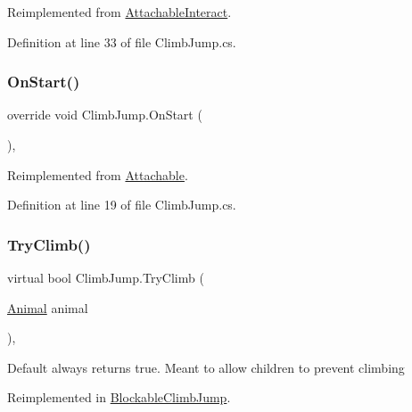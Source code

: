 Reimplemented from \mbox{\hyperlink{class_attachable_interact_a376127af23be5456604ee5ec39f02b9b}{Attachable\+Interact}}.



Definition at line 33 of file Climb\+Jump.\+cs.

\mbox{\label{class_climb_jump_a094788a5de43e24f111eec10ba0a3c88}} 
\subsubsection{\texorpdfstring{On\+Start()}{OnStart()}}
{\footnotesize\ttfamily override void Climb\+Jump.\+On\+Start (\begin{DoxyParamCaption}{ }\end{DoxyParamCaption})\hspace{0.3cm}{\ttfamily [protected]}, {\ttfamily [virtual]}}



Reimplemented from \mbox{\hyperlink{class_attachable_a3c05c0b07b831881a7ab245057d34d30}{Attachable}}.



Definition at line 19 of file Climb\+Jump.\+cs.

\mbox{\label{class_climb_jump_aa112e141ea3e2ddb0325f65e4171fdac}} 
\subsubsection{\texorpdfstring{Try\+Climb()}{TryClimb()}}
{\footnotesize\ttfamily virtual bool Climb\+Jump.\+Try\+Climb (\begin{DoxyParamCaption}\item[{\mbox{\hyperlink{class_animal}{Animal}}}]{animal }\end{DoxyParamCaption})\hspace{0.3cm}{\ttfamily [protected]}, {\ttfamily [virtual]}}



Default always returns true. Meant to allow children to prevent climbing 



Reimplemented in \mbox{\hyperlink{class_blockable_climb_jump_a58cf472a84d9fb9f01800f75b56fd197}{Blockable\+Climb\+Jump}}.



